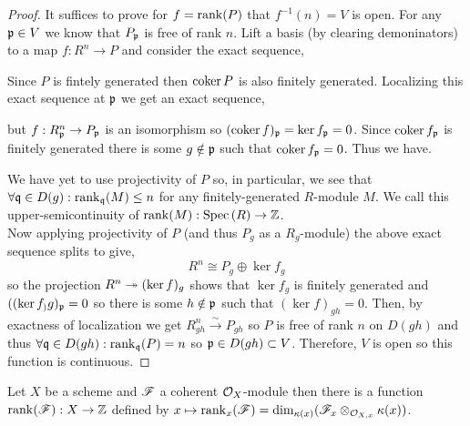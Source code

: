 \documentclass[12pt]{article}
\begin{document}
\begin{proof}
It suffices to prove for $f = \mathrm{rank}(P)$ that $f^{-1}(n) = V$ is open. For any $\mathfrak{p} \in V$ we know that $P_{\mathfrak{p}}$ is free of rank $n$. Lift a basis (by clearing demoninators) to a map $f : R^n \to P$ and consider the exact sequence,
\begin{center}
\end{center}  
Since $P$ is fintely generated then $\operatorname{\mathrm{coker}}{P}$ is also finitely generated. Localizing this exact sequence at $\mathfrak{p}$ we get an exact sequence,
\begin{center}
\end{center}
but $f : R^n_{\mathfrak{p}} \to P_{\mathfrak{p}}$ is an isomorphism so $(\operatorname{\mathrm{coker}}{f})_{\mathfrak{p}} = \ker{f}_{\mathfrak{p}} = 0$. Since $\operatorname{\mathrm{coker}}{f}_{\mathfrak{p}}$ is finitely generated there is some $g \notin \mathfrak{p}$ such that $\operatorname{\mathrm{coker}}{f}_{\mathfrak{p}} = 0$. Thus we have.
\begin{center}
\end{center}
We have yet to use projectivity of $P$ so,
in particular, we see that $\forall \mathfrak{q} \in D(g) : \mathrm{rank}_{\mathfrak{q}}(M) \le n$ for any finitely-generated $R$-module $M$. We call this upper-semicontinuity of $\mathrm{rank}(M) : \mathrm{Spec}\left( R \right) \to \mathbb{Z}$.
\bigskip\\
Now applying projectivity of $P$ (and thus $P_g$ as a $R_g$-module) the above exact sequence splits to give,
\[ R^n \cong P_g \oplus \ker{f}_g \]
so the projection $R^n \twoheadrightarrow (\ker{f})_g$ shows that $\ker{f}_g$ is finitely generated and $((\ker{f}_)g)_{\mathfrak{p}} = 0$ so there is some $h \notin \mathfrak{p}$ such that $(\ker{f})_{gh} = 0$. Then, by exactness of localization we get $R_{gh}^n \xrightarrow{\sim} P_{gh}$ so $P$ is free of rank $n$ on $D(gh)$ and thus $\forall \mathfrak{q} \in D(gh) : \mathrm{rank}_{\mathfrak{q}}(P) = n$ so $\mathfrak{p} \in D(gh) \subset V$. Therefore, $V$ is open so this function is continuous.  
\end{proof}


\begin{definition}
Let $X$ be a scheme and $\mathscr{F}$ a coherent $\mathcal{O}_{X}$-module then there is a function $\mathrm{rank}(\mathscr{F}) : X \to \mathbb{Z}$ defined by $x \mapsto \mathrm{rank}_x(\mathscr{F}) = \dim_{\kappa(x)}(\mathscr{F}_x \otimes_{\mathcal{O}_{X, x}} \kappa(x))$. 
\end{definition}
\end{document}
